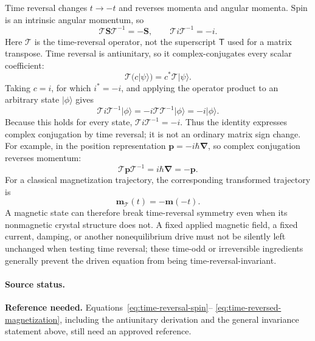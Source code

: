 Time reversal changes $t\to-t$ and reverses momenta and angular momenta.  Spin
is an intrinsic angular momentum, so
\begin{equation}
    \mathcal{T}\mathbf{S}\mathcal{T}^{-1}=-\mathbf{S},
    \qquad
    \mathcal{T}i\mathcal{T}^{-1}=-i.
    \label{eq:time-reversal-spin}
\end{equation}
Here $\mathcal{T}$ is the time-reversal operator, not the superscript
$\mathsf{T}$ used for a matrix transpose.  Time reversal is antiunitary, so it
complex-conjugates every scalar coefficient:
\begin{equation}
    \mathcal{T}\bigl(c\lvert\psi\rangle\bigr)
    =c^*\mathcal{T}\lvert\psi\rangle.
    \label{eq:time-reversal-antilinearity}
\end{equation}
Taking $c=i$, for which $i^*=-i$, and applying the operator product to an
arbitrary state $\lvert\phi\rangle$ gives
\begin{equation}
    \mathcal{T}i\mathcal{T}^{-1}\lvert\phi\rangle
    =-i\mathcal{T}\mathcal{T}^{-1}\lvert\phi\rangle
    =-i\lvert\phi\rangle.
    \label{eq:time-reversal-imaginary-unit}
\end{equation}
Because this holds for every state,
$\mathcal{T}i\mathcal{T}^{-1}=-i$.  Thus the identity expresses complex
conjugation by time reversal; it is not an ordinary matrix sign change.  For
example, in the position representation $\mathbf{p}=-i\hbar\boldsymbol{\nabla}$,
so complex conjugation reverses momentum:
\begin{equation}
    \mathcal{T}\mathbf{p}\mathcal{T}^{-1}
    =i\hbar\boldsymbol{\nabla}
    =-\mathbf{p}.
    \label{eq:time-reversal-momentum}
\end{equation}
For a classical magnetization trajectory, the corresponding transformed
trajectory is
\begin{equation}
    \mathbf{m}_{\mathcal{T}}(t)=-\mathbf{m}(-t).
    \label{eq:time-reversed-magnetization}
\end{equation}
A magnetic state can therefore break time-reversal symmetry even when its
nonmagnetic crystal structure does not.  A fixed applied magnetic field, a
fixed current, damping, or another nonequilibrium drive must not be silently
left unchanged when testing time reversal; these time-odd or irreversible
ingredients generally prevent the driven equation from being
time-reversal-invariant.

\paragraph{Source status.}
\textbf{Reference needed.}  Equations~\eqref{eq:time-reversal-spin}--
\eqref{eq:time-reversed-magnetization}, including the antiunitary derivation
and the general invariance statement above, still need an approved reference.

